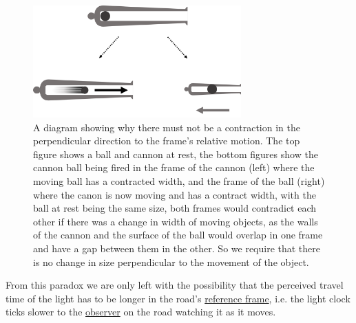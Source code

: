 \begin{figure}[H]
	\centering
	\includegraphics[width=8cm]{images/pdf/Cannon_Balls.pdf}
	\caption{A diagram showing why there must not be a contraction in the perpendicular direction to the frame's relative motion. The top figure shows a ball and cannon at rest, the bottom figures show the cannon ball being fired in the frame of the cannon (left) where the moving ball has a contracted width, and the frame of the ball (right) where the canon is now moving and has a contract width, with the ball at rest being the same size, both frames would contradict each other if there was a change in width of moving objects, as the walls of the cannon and the surface of the ball would overlap in one frame and have a gap between them in the other. So we require that there is no change in size perpendicular to the movement of the object.}
	\label{fig: width contraction}
\end{figure}


From this paradox we are only left with the possibility that the perceived travel time of the light has to be longer in the road's \hyperlink{def-Reference-frame}{reference frame}, i.e. the light clock ticks slower to the \hyperlink{def-observer}{observer} on the road watching it as it moves.

